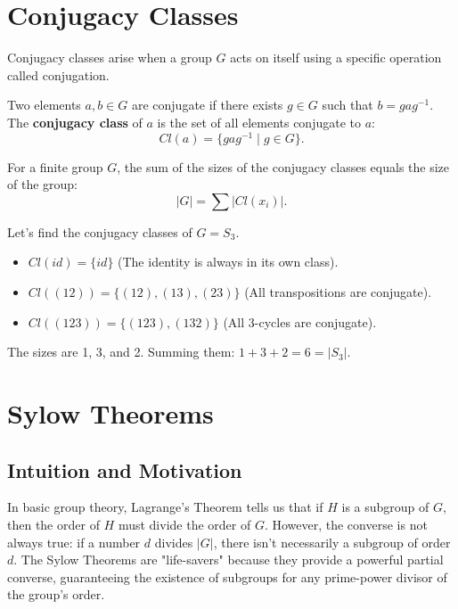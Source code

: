 \section{Conjugacy Classes}

Conjugacy classes arise when a group $G$ acts on itself using a specific operation called conjugation.

\begin{definition}
Two elements $a, b \in G$ are conjugate if there exists $g \in G$ such that $b = gag^{-1}$. The \textbf{conjugacy class} of $a$ is the set of all elements conjugate to $a$:
\[ Cl(a) = \{ gag^{-1} \mid g \in G \}. \]
\end{definition}

\begin{theorem}
For a finite group $G$, the sum of the sizes of the conjugacy classes equals the size of the group:
\[ |G| = \sum |Cl(x_i)|. \]
\end{theorem}

\begin{example}
Let's find the conjugacy classes of $G = S_3$.
\begin{itemize}
    \item $Cl(id) = \{id\}$ (The identity is always in its own class).
    \item $Cl((12)) = \{(12), (13), (23)\}$ (All transpositions are conjugate).
    \item $Cl((123)) = \{(123), (132)\}$ (All 3-cycles are conjugate).
\end{itemize}
The sizes are 1, 3, and 2. Summing them: $1 + 3 + 2 = 6 = |S_3|$.
\end{example}

\section{Sylow Theorems}

\subsection{Intuition and Motivation}
In basic group theory, Lagrange's Theorem tells us that if $H$ is a subgroup of $G$, then the order of $H$ must divide the order of $G$. However, the converse is not always true: if a number $d$ divides $|G|$, there isn't necessarily a subgroup of order $d$. The Sylow Theorems are "life-savers" because they provide a powerful partial converse, guaranteeing the existence of subgroups for any prime-power divisor of the group's order.

